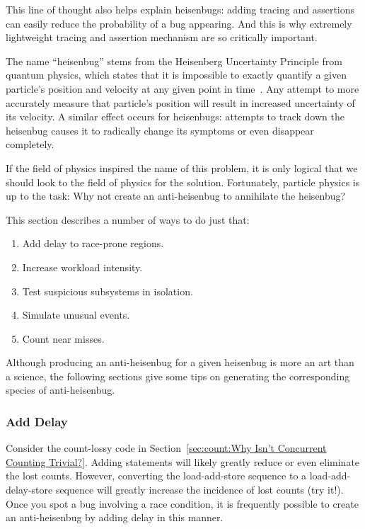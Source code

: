 This line of thought also helps explain heisenbugs:
adding tracing and assertions can easily reduce the probability
of a bug appearing.
And this is why extremely lightweight tracing and assertion mechanism are
so critically important.

The name ``heisenbug'' stems from the Heisenberg Uncertainty Principle
from quantum physics, which states that it is impossible to exactly
quantify a given particle's position and velocity at any given point
in time~\cite{WeinerHeisenberg1927Uncertain}.
Any attempt to more accurately measure that particle's position will
result in increased uncertainty of its velocity.
A similar effect occurs for heisenbugs: attempts to track down the heisenbug
causes it to radically change its symptoms or even disappear completely.

If the field of physics inspired the name of this problem, it is only
logical that we should look to the field of physics for the solution.
Fortunately, particle physics is up to the task:
Why not create an anti-heisenbug to annihilate the heisenbug?

This section describes a number of ways to do just that:

\begin{enumerate}
\item	Add delay to race-prone regions.
\item	Increase workload intensity.
\item	Test suspicious subsystems in isolation.
\item	Simulate unusual events.
\item	Count near misses.
\end{enumerate}

Although producing an anti-heisenbug for a given heisenbug is more an
art than a science, the following sections give some tips on
generating the corresponding species of anti-heisenbug.

\subsubsection{Add Delay}
\label{sec:debugging:Add Delay}

Consider the count-lossy code in
Section~\ref{sec:count:Why Isn't Concurrent Counting Trivial?}.
Adding  statements will likely greatly reduce or even
eliminate the lost counts.
However, converting the load-add-store sequence to a load-add-delay-store
sequence will greatly increase the incidence of lost counts (try it!).
Once you spot a bug involving a race condition, it is frequently possible
to create an anti-heisenbug by adding delay in this manner.

